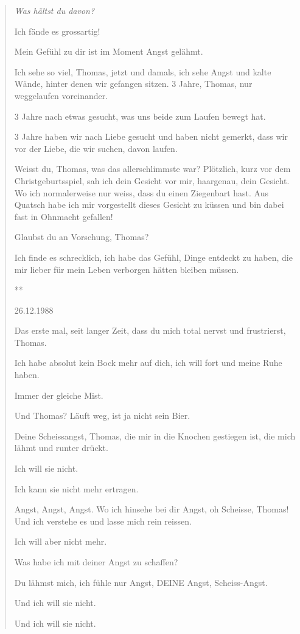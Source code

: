 \documentclass[10pt,titlepage,a5paper]{book}
\newcommand{\sterne}{\par{\centering ***\par}}
\newenvironment{tg}{\begin{quote}\em}{\end{quote}}
\begin{document}
\begin{tg}
Was hältst du davon?

Ich fände es grossartig!

Mein Gefühl zu dir ist im Moment Angst gelähmt.

Ich sehe so viel, Thomas, jetzt und damals, ich sehe Angst und kalte Wände, hinter denen wir gefangen sitzen.
 3 Jahre, Thomas, nur weggelaufen voreinander.

3 Jahre nach etwas gesucht, was uns beide zum Laufen bewegt hat.

3 Jahre haben wir nach Liebe gesucht und haben nicht gemerkt, dass wir vor der Liebe, die wir suchen, davon laufen.

Weisst du, Thomas, was das allerschlimmste war? Plötzlich, kurz vor dem Christgeburtsspiel, sah ich dein Gesicht vor mir, haargenau, dein Gesicht. Wo ich normalerweise nur weiss, dass du einen Ziegenbart hast.
Aus Quatsch habe ich mir vorgestellt dieses Gesicht zu küssen und bin dabei fast in Ohnmacht gefallen!

Glaubst du an Vorsehung, Thomas?

Ich finde es schrecklich, ich habe das Gefühl, Dinge entdeckt zu haben, die mir lieber für mein Leben verborgen hätten bleiben müssen.


\sterne


26.12.1988

Das erste mal, seit langer Zeit, dass du mich total nervst und frustrierst, Thomas.

Ich habe absolut kein Bock mehr auf dich, ich will fort und meine Ruhe haben.

Immer der gleiche Mist.

Und Thomas? Läuft weg, ist ja nicht sein Bier.

Deine Scheissangst, Thomas, die mir in die Knochen gestiegen ist, die mich lähmt und runter drückt.

Ich will sie nicht.

Ich kann sie nicht mehr ertragen.

Angst, Angst, Angst. Wo ich hinsehe bei dir Angst, oh Scheisse, Thomas!
Und ich verstehe es und lasse mich rein reissen.

Ich will aber nicht mehr.

Was habe ich mit deiner Angst zu schaffen?

Du lähmst mich, ich fühle nur Angst, DEINE Angst, Scheiss-Angst.

Und ich will sie nicht.

Und ich will sie nicht.


\end{tg}
\end{document}
